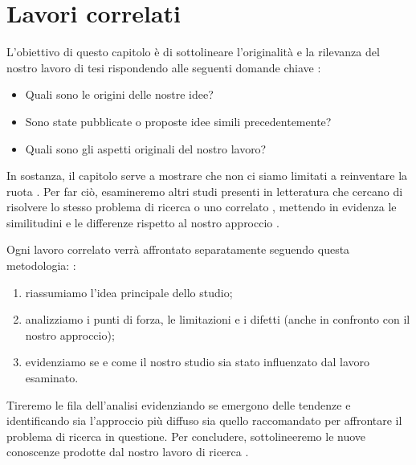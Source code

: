 \chapter{Lavori correlati}
\label{chap:correlati}

\acresetall

L'obiettivo di questo capitolo è di sottolineare l'originalità e la rilevanza del nostro lavoro di tesi rispondendo alle seguenti domande chiave \cite{aceto2023paper}:
\begin{itemize}
\item Quali sono le origini delle nostre idee?
\item Sono state pubblicate o proposte idee simili precedentemente?
\item Quali sono gli aspetti originali del nostro lavoro?
\end{itemize}

In sostanza, il capitolo serve a mostrare che non ci siamo limitati a reinventare la ruota \cite{tuni2019guide}. Per far ciò, esamineremo altri studi presenti in letteratura che cercano di risolvere lo stesso problema di ricerca o uno correlato \cite{pfandzelter2022thesis}, mettendo in evidenza le similitudini e le differenze rispetto al nostro approccio \cite{tuni2019guide}.

\medskip

Ogni lavoro correlato verrà affrontato separatamente seguendo questa metodologia: \cite{pfandzelter2022thesis}:
\begin{enumerate}
\item riassumiamo l'idea principale dello studio;
\item analizziamo i punti di forza, le limitazioni e i difetti (anche in confronto con il nostro approccio);
\item evidenziamo se e come il nostro studio sia stato influenzato dal lavoro esaminato.
\end{enumerate}

Tireremo le fila dell'analisi evidenziando se emergono delle tendenze e identificando sia l'approccio più diffuso sia quello raccomandato per affrontare il problema di ricerca in questione. Per concludere, sottolineeremo le nuove conoscenze prodotte dal nostro lavoro di ricerca \cite{tuni2019guide}.

\medskip


